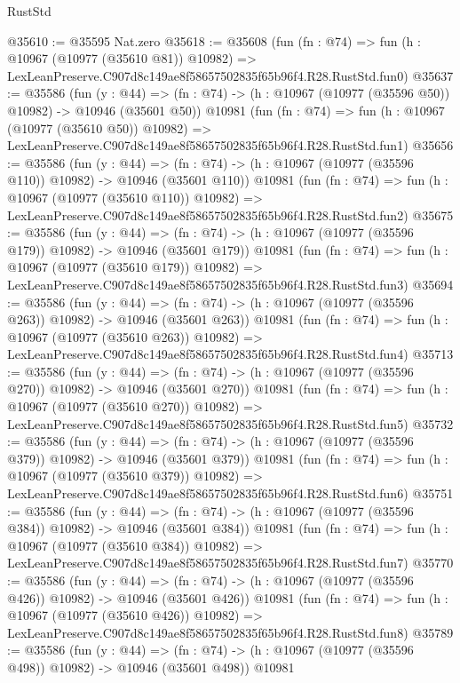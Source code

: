 \begin{lexlean}{RustStd}
\begin{coremodule}
@35610 := @35595 Nat.zero
@35618 := @35608
    (fun (fn : @74) =>
    fun (h : @10967 (@10977 (@35610 @81)) @10982) =>
    LexLeanPreserve.C907d8c149ae8f58657502835f65b96f4.R28.RustStd.fun0)
@35637 := @35586
    (fun (y : @44) =>
    (fn : @74) -> (h : @10967 (@10977 (@35596 @50)) @10982) -> @10946 (@35601 @50))
    @10981
    (fun (fn : @74) =>
    fun (h : @10967 (@10977 (@35610 @50)) @10982) =>
    LexLeanPreserve.C907d8c149ae8f58657502835f65b96f4.R28.RustStd.fun1)
@35656 := @35586
    (fun (y : @44) =>
    (fn : @74) -> (h : @10967 (@10977 (@35596 @110)) @10982) -> @10946 (@35601 @110))
    @10981
    (fun (fn : @74) =>
    fun (h : @10967 (@10977 (@35610 @110)) @10982) =>
    LexLeanPreserve.C907d8c149ae8f58657502835f65b96f4.R28.RustStd.fun2)
@35675 := @35586
    (fun (y : @44) =>
    (fn : @74) -> (h : @10967 (@10977 (@35596 @179)) @10982) -> @10946 (@35601 @179))
    @10981
    (fun (fn : @74) =>
    fun (h : @10967 (@10977 (@35610 @179)) @10982) =>
    LexLeanPreserve.C907d8c149ae8f58657502835f65b96f4.R28.RustStd.fun3)
@35694 := @35586
    (fun (y : @44) =>
    (fn : @74) -> (h : @10967 (@10977 (@35596 @263)) @10982) -> @10946 (@35601 @263))
    @10981
    (fun (fn : @74) =>
    fun (h : @10967 (@10977 (@35610 @263)) @10982) =>
    LexLeanPreserve.C907d8c149ae8f58657502835f65b96f4.R28.RustStd.fun4)
@35713 := @35586
    (fun (y : @44) =>
    (fn : @74) -> (h : @10967 (@10977 (@35596 @270)) @10982) -> @10946 (@35601 @270))
    @10981
    (fun (fn : @74) =>
    fun (h : @10967 (@10977 (@35610 @270)) @10982) =>
    LexLeanPreserve.C907d8c149ae8f58657502835f65b96f4.R28.RustStd.fun5)
@35732 := @35586
    (fun (y : @44) =>
    (fn : @74) -> (h : @10967 (@10977 (@35596 @379)) @10982) -> @10946 (@35601 @379))
    @10981
    (fun (fn : @74) =>
    fun (h : @10967 (@10977 (@35610 @379)) @10982) =>
    LexLeanPreserve.C907d8c149ae8f58657502835f65b96f4.R28.RustStd.fun6)
@35751 := @35586
    (fun (y : @44) =>
    (fn : @74) -> (h : @10967 (@10977 (@35596 @384)) @10982) -> @10946 (@35601 @384))
    @10981
    (fun (fn : @74) =>
    fun (h : @10967 (@10977 (@35610 @384)) @10982) =>
    LexLeanPreserve.C907d8c149ae8f58657502835f65b96f4.R28.RustStd.fun7)
@35770 := @35586
    (fun (y : @44) =>
    (fn : @74) -> (h : @10967 (@10977 (@35596 @426)) @10982) -> @10946 (@35601 @426))
    @10981
    (fun (fn : @74) =>
    fun (h : @10967 (@10977 (@35610 @426)) @10982) =>
    LexLeanPreserve.C907d8c149ae8f58657502835f65b96f4.R28.RustStd.fun8)
@35789 := @35586
    (fun (y : @44) =>
    (fn : @74) -> (h : @10967 (@10977 (@35596 @498)) @10982) -> @10946 (@35601 @498))
    @10981

\end{coremodule}
\end{lexlean}
